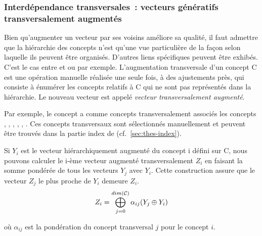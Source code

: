 \subsubsection{Interdépendance transversales~: vecteurs génératifs transversalement augmentés}

Bien qu'augmenter un vecteur par ses voisins améliore sa qualité, il
faut admettre que la hiérarchie des concepts n'est qu'une vue
particulière de la façon selon laquelle ils peuvent être organisés.
D'autres liens spécifiques peuvent être exhibés.  C'est le cas entre
 et  ou  par
exemple.  L'augmentation transversale d'un concept C est une opération
manuelle réalisée une seule fois, à des ajustements près, qui consiste
à énumérer les concepts relatifs à C qui ne sont pas représentés dans
la hiérarchie.  Le nouveau vecteur est appelé \emph{vecteur
  transversalement augmenté}.

Par exemple, le concept  a comme concepts transversalement
associés les concepts , , ,
, , .  Ces concepts
transversaux sont sélectionnés manuellement et peuvent être trouvés
dans la partie index de \cite{Thesaurus1992}
(cf.~\ref{sec:thes-index}).

Si $Y_i$ est le vecteur hiérarchiquement augmenté du concept i défini
sur \cal C, nous pouvons calculer le i-ème vecteur augmenté
transversalement $Z_i$ en faisant la somme pondérée de tous les
vecteurs $Y_j$ avec $Y_i$.  Cette construction assure que le vecteur
$Z_j$ le plus proche de $Y_i$ demeure $Z_i$.
\begin{equation}
  Z_{i} =  \bigoplus_{j=0}^{dim(\cal C)} \alpha_{ij}(Y_{j} \oplus
Y_{i})
\end{equation}

où $\alpha_{ij}$ est la pondération du concept transversal $j$ pour le
concept $i$.

